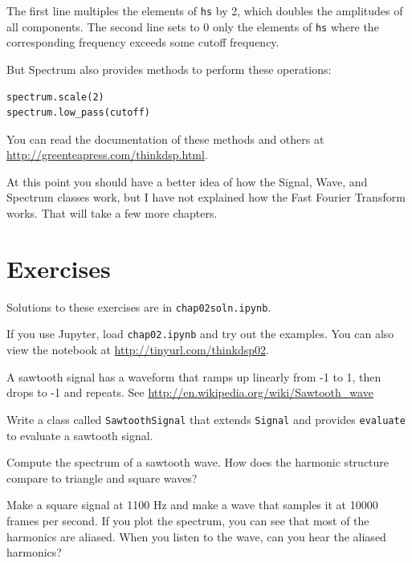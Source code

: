 \documentclass[12pt]{book}
\begin{document}
The first line multiples the elements of {\tt hs} by 2, which
doubles the amplitudes of all components.  The second line
sets to 0 only the elements of {\tt hs} where the corresponding
frequency exceeds some cutoff frequency.

But Spectrum also provides methods to perform these operations:

\begin{verbatim}
spectrum.scale(2)
spectrum.low_pass(cutoff)
\end{verbatim}

You can read the documentation of these methods and others at
\url{http://greenteapress.com/thinkdsp.html}.

At this point you should have a better idea of how the Signal, Wave,
and Spectrum classes work, but I have not explained how the Fast
Fourier Transform works.  That will take a few more chapters.


\section{Exercises}

Solutions to these exercises are in {\tt chap02soln.ipynb}.

\begin{exercise}
If you use Jupyter, load {\tt chap02.ipynb} and try out the examples.
You can also view the notebook at \url{http://tinyurl.com/thinkdsp02}.
\end{exercise}

\begin{exercise}
A sawtooth signal has a waveform that ramps up linearly from -1 to 1,
then drops to -1 and repeats. See
\url{http://en.wikipedia.org/wiki/Sawtooth_wave}

Write a class called
{\tt SawtoothSignal} that extends {\tt Signal} and provides
{\tt evaluate} to evaluate a sawtooth signal.

Compute the spectrum of a sawtooth wave.  How does the harmonic
structure compare to triangle and square waves?
\end{exercise}

\begin{exercise}
Make a square signal at 1100 Hz and make a wave that samples it
at 10000 frames per second.  If you plot the spectrum, you can
see that most of the harmonics are aliased.
When you listen to the wave, can you hear the aliased harmonics?
\end{exercise}
\end{document}
